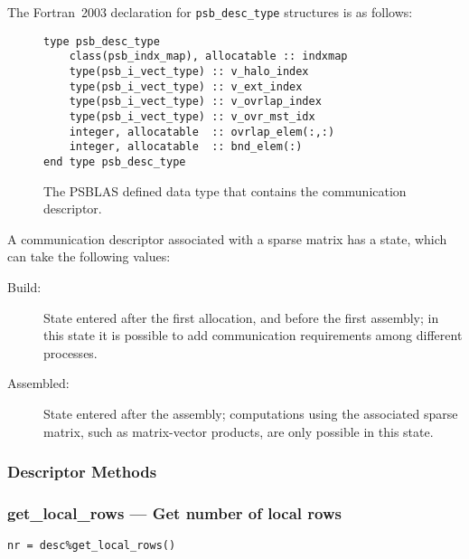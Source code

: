 The Fortran~2003 declaration  for \verb|psb_desc_type| structures is 
as follows:
\begin{figure}[h!]
\begin{center}
    \begin{minipage}[tl]{0.9\textwidth}
\begin{verbatim} 
type psb_desc_type 
    class(psb_indx_map), allocatable :: indxmap
    type(psb_i_vect_type) :: v_halo_index
    type(psb_i_vect_type) :: v_ext_index
    type(psb_i_vect_type) :: v_ovrlap_index
    type(psb_i_vect_type) :: v_ovr_mst_idx 
    integer, allocatable  :: ovrlap_elem(:,:)
    integer, allocatable  :: bnd_elem(:)
end type psb_desc_type 
\end{verbatim}
    \end{minipage}
  \end{center}
  \caption{\label{fig:desctype}The PSBLAS defined data type that
    contains the communication descriptor.}
\end{figure}
A communication descriptor associated with a sparse  matrix has a
state, which can take the following values:
\begin{description}
\item[Build:] State entered after the first allocation, and before the
  first assembly; in this state it is possible to add communication
  requirements among different processes. 
\item[Assembled:] State entered after the assembly; computations using
  the associated sparse matrix, such as matrix-vector products, are
  only possible   in this state.
\end{description}

\subsubsection{Descriptor Methods} 

\subsubsection{get\_local\_rows --- Get number of local rows}

\begin{verbatim}
nr = desc%get_local_rows()
\end{verbatim}


